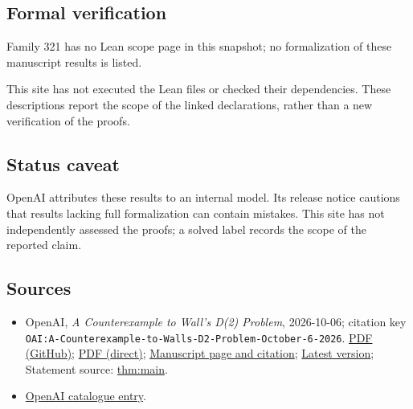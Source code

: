 \documentclass[11pt]{article}
\begin{document}
\subsection{Formal verification}
Family 321 has no Lean scope page in this snapshot; no formalization of these manuscript results is listed.

This site has not executed the Lean files or checked their dependencies. These descriptions report the scope of the linked declarations, rather than a new verification of the proofs.

\subsection{Status caveat}
OpenAI attributes these results to an internal model. Its release notice cautions that results lacking full formalization can contain mistakes. This site has not independently assessed the proofs; a solved label records the scope of the reported claim.

\subsection{Sources}
\begin{itemize}
\item OpenAI, \emph{A Counterexample to Wall's D(2) Problem}, 2026-10-06; citation key \texttt{OAI:A-Counterexample-to-Walls-D2-Problem-October-6-2026}. \href{https://github.com/openai/math/blob/adc7f1241b42e322a6451854ab7e4b4c146bf78a/preprints/A-Counterexample-to-Walls-D2-Problem-October-6-2026/wall-d2-counterexample.pdf}{PDF (GitHub)}; \href{https://github.com/openai/math/raw/adc7f1241b42e322a6451854ab7e4b4c146bf78a/preprints/A-Counterexample-to-Walls-D2-Problem-October-6-2026/wall-d2-counterexample.pdf}{PDF (direct)}; \href{https://github.com/openai/math/blob/adc7f1241b42e322a6451854ab7e4b4c146bf78a/preprints/A-Counterexample-to-Walls-D2-Problem-October-6-2026/README.md}{Manuscript page and citation}; \href{https://github.com/openai/math/blob/main/preprints/A-Counterexample-to-Walls-D2-Problem-October-6-2026/wall-d2-counterexample.pdf}{Latest version}; Statement source: \href{https://github.com/openai/math/blob/adc7f1241b42e322a6451854ab7e4b4c146bf78a/preprints/A-Counterexample-to-Walls-D2-Problem-October-6-2026/build/sections/01-introduction.tex\#L19}{thm:main}.
\item \href{https://github.com/openai/math/blob/adc7f1241b42e322a6451854ab7e4b4c146bf78a/CONTENTS.md}{OpenAI catalogue entry}.
\end{itemize}
\end{document}
